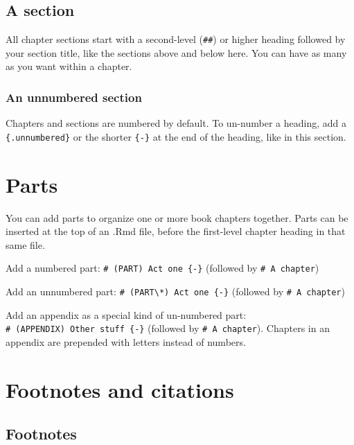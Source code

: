 \documentclass[
]{book}
\theoremstyle{definition}
\theoremstyle{definition}
\theoremstyle{definition}
\theoremstyle{definition}
\theoremstyle{remark}
\begin{document}
\hypertarget{a-section}{%
\section{A section}\label{a-section}}

All chapter sections start with a second-level (\texttt{\#\#}) or higher heading followed by your section title, like the sections above and below here. You can have as many as you want within a chapter.

\hypertarget{an-unnumbered-section}{%
\subsection*{An unnumbered section}\label{an-unnumbered-section}}

Chapters and sections are numbered by default. To un-number a heading, add a \texttt{\{.unnumbered\}} or the shorter \texttt{\{-\}} at the end of the heading, like in this section.

\hypertarget{parts}{%
\chapter{Parts}\label{parts}}

You can add parts to organize one or more book chapters together. Parts can be inserted at the top of an .Rmd file, before the first-level chapter heading in that same file.

Add a numbered part: \texttt{\#\ (PART)\ Act\ one\ \{-\}} (followed by \texttt{\#\ A\ chapter})

Add an unnumbered part: \texttt{\#\ (PART\textbackslash{}*)\ Act\ one\ \{-\}} (followed by \texttt{\#\ A\ chapter})

Add an appendix as a special kind of un-numbered part: \texttt{\#\ (APPENDIX)\ Other\ stuff\ \{-\}} (followed by \texttt{\#\ A\ chapter}). Chapters in an appendix are prepended with letters instead of numbers.

\hypertarget{footnotes-and-citations}{%
\chapter{Footnotes and citations}\label{footnotes-and-citations}}

\hypertarget{footnotes}{%
\section{Footnotes}\label{footnotes}}
\end{document}
